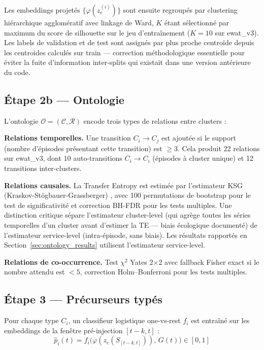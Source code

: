Les embeddings projetés $\{\varphi(z_e^{(i)})\}$ sont ensuite regroupés par clustering
hiérarchique agglomératif avec linkage de Ward, $K$ étant sélectionné par maximum du
score de silhouette sur le jeu d'entraînement ($K = 10$ sur ewat\_v3).
Les labels de validation et de test sont assignés par plus proche centroïde depuis les
centroides calculés sur train --- correction méthodologique essentielle pour éviter la
fuite d'information inter-splits qui existait dans une version antérieure du code.

\subsection{Étape 2b --- Ontologie}
\label{sec:ontology}

L'ontologie $\mathcal{O} = (\mathcal{C}, \mathcal{R})$ encode trois types de relations
entre clusters :

\textbf{Relations temporelles.}
Une transition $C_i \to C_j$ est ajoutée si le support (nombre d'épisodes présentant
cette transition) est $\geq 3$. Cela produit 22 relations sur ewat\_v3, dont
10 auto-transitions $C_i \to C_i$ (épisodes à cluster unique) et 12 transitions inter-clusters.

\textbf{Relations causales.}
La Transfer Entropy est estimée par l'estimateur KSG (Kraskov-Stögbauer-Grassberger)
\cite{kraskov2004}, avec 100 permutations de bootstrap pour le test de significativité
et correction BH-FDR \cite{benjamini1995} pour les tests multiples.
Une distinction critique sépare l'estimateur cluster-level (qui agrège toutes les séries
temporelles d'un cluster avant d'estimer la TE --- biais écologique documenté) de
l'estimateur service-level (intra-épisode, sans biais). Les résultats rapportés en
Section~\ref{sec:ontology_results} utilisent l'estimateur service-level.

\textbf{Relations de co-occurrence.}
Test $\chi^2$ Yates 2$\times$2 avec fallback Fisher exact si le nombre attendu est $< 5$,
correction Holm--Bonferroni pour les tests multiples.

\subsection{Étape 3 --- Précurseurs typés}
\label{sec:precursor}

Pour chaque type $C_i$, un classifieur logistique one-vs-rest $f_i$ est entraîné
sur les embeddings de la fenêtre pré-injection $[t-k, t]$ :
\[
  \hat{p}_i(t) = f_i\!\bigl(\varphi(z_e(S_{[t-k,t]})),\, G(t)\bigr) \in [0,1]
\]

